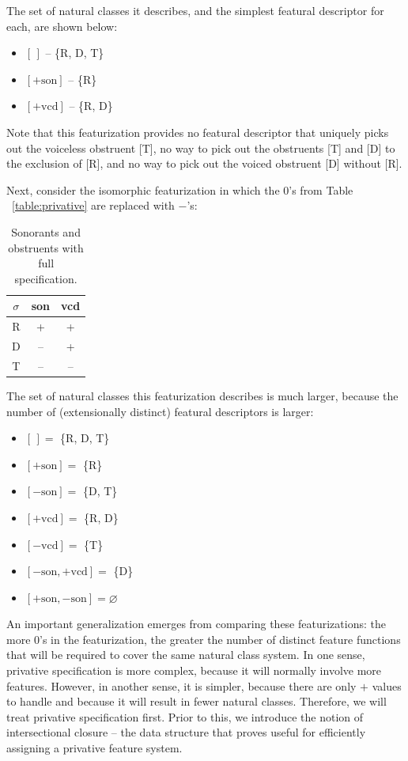 \documentclass[11pt, oneside]{article}   	%
\begin{document}
\noindent The set of natural classes it describes, and the simplest featural descriptor for each, are shown below: \begin{itemize}
  \item $[\,]$ -- \{R, D, T\}
  \item $[+\text{son}]$ -- \{R\}
  \item $[+\text{vcd}]$ -- \{R, D\}
  \end{itemize}
  
\noindent Note that this featurization provides no featural descriptor that uniquely picks out the voiceless obstruent [T], no way to pick out the obstruents [T] and [D] to the exclusion of [R], and no way to pick out the voiced obstruent [D] without [R].

Next, consider the isomorphic featurization in which the $0$'s from Table ~\ref{table:privative} are replaced with $-$'s:

\begin{table}[h]
    \centering
    \begin{tabular} {|c||c|c|}
    \hline
        $\sigma$ & son & vcd \\ \hline
        R & + & + \\
        D & -- & + \\
        T & -- & -- \\
        \hline
    \end{tabular}
    \caption{Sonorants and obstruents with full specification.}
    \label{table:full}
\end{table}

\noindent The set of natural classes this featurization describes is much larger, because the number of (extensionally distinct) featural descriptors is larger: \begin{itemize}
    \item $[\,] =$ \{R, D, T\}
    \item $[+\text{son}] =$ \{R\}
    \item $[-\text{son}] =$ \{D, T\}
    \item $[+\text{vcd}] =$ \{R, D\}
    \item $[-\text{vcd}] =$ \{T\}
    \item $[-\text{son},+\text{vcd}] =$ \{D\}
    \item $[+\text{son},-\text{son}] = \varnothing$
    \end{itemize}

\noindent An important generalization emerges from comparing these featurizations: the more $0$'s in the featurization, the greater the number of distinct feature functions that will be required to cover the same natural class system. In one sense, privative specification is more complex, because it will normally involve more features. However, in another sense, it is simpler, because there are only $+$ values to handle and because it will result in fewer natural classes. Therefore, we will treat privative specification first. Prior to this, we introduce the notion of intersectional closure -- the data structure that proves useful for efficiently assigning a privative feature system.
\end{document}
